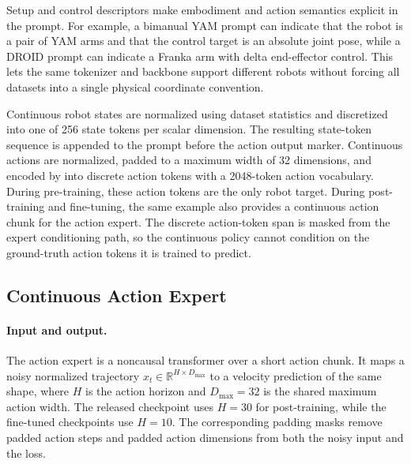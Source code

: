 Setup and control descriptors make embodiment and action semantics explicit in
the prompt. For example, a bimanual YAM prompt can indicate that the robot is a
pair of YAM arms and that the control target is an absolute joint pose, while a
DROID prompt can indicate a Franka arm with delta end-effector control. This
lets the same tokenizer and backbone support different robots without forcing
all datasets into a single physical coordinate convention.

Continuous robot states are normalized using dataset statistics and discretized
into one of 256 state tokens per scalar dimension. The resulting state-token
sequence is appended to the prompt before the action output marker. Continuous
actions are normalized, padded to a maximum width of 32 dimensions, and encoded
by \molmoactfast into discrete action tokens with a 2048-token action
vocabulary. During pre-training, these action tokens are the only robot target.
During post-training and fine-tuning, the same example also provides a
continuous action chunk for the action expert. The discrete action-token span is
masked from the expert conditioning path, so the continuous policy cannot
condition on the ground-truth action tokens it is trained to predict.



\subsection{Continuous Action Expert}
\label{supp:model-action-expert}

\paragraph{Input and output.}
The action expert is a noncausal transformer over a short action chunk. It maps
a noisy normalized trajectory
\(x_t \in \mathbb{R}^{H \times D_{\max}}\) to a velocity prediction of the same
shape, where \(H\) is the action horizon and \(D_{\max}=32\) is the shared
maximum action width. The released \molmoactt checkpoint uses \(H=30\) for
post-training, while the \libero fine-tuned checkpoints use \(H=10\). The
corresponding padding masks remove padded action steps and padded action
dimensions from both the noisy input and the loss.

